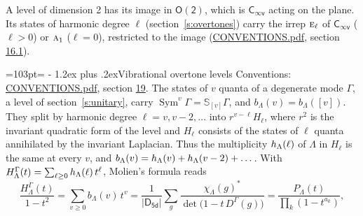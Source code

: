 \documentclass[10pt,a4paper]{article}
\makeatletter
\renewcommand\section{\@startsection{section}{1}{\z@}{-3ex plus -1ex minus -.2ex}%
  {1.2ex plus .2ex}{\normalfont\large\sffamily\bfseries\color{parttitle}}}
\newcommand{\needspace}[1]{\par\penalty-100\begingroup\dimen0=#1\relax\dimen2=\pagegoal
  \advance\dimen2-\pagetotal\ifdim\dimen0>\dimen2\relax\ifdim\dimen2>0pt\vfil\break\fi\fi
  \endgroup}
\numberwithin{equation}{section}
\newcommand{\grp}[1]{\mathsf{#1}}
\newcommand{\irr}[1]{\text{\normalfont\scshape #1}}
\newcommand{\repD}[1]{D^{#1}}
\newcommand{\irchar}[1]{\chi_{#1}}
\newcommand{\conj}[1]{{#1}^{*}}
\newcommand{\schur}[1]{\mathbb{S}_{#1}}
\newcommand{\shape}[1]{[#1]}
\makeatother
\begin{document}
A level of dimension 2 has its image in $\grp{O(2)}$, which is \href{Cinfv.pdf}{$\grp{C_{\infty v}}$} acting on the plane. \label{n:index.harmonic.degree}Its states of harmonic degree $\ell$ (section~\ref{s:overtones}) carry the irrep $\irr{e}_{\ell}$ of \href{Cinfv.pdf}{$\grp{C_{\infty v}}$} ($\ell > 0$) or $\irr{a}_{1}$ ($\ell = 0$), restricted to the image (\href{../../CONVENTIONS.pdf}{CONVENTIONS.pdf}, section \href{../../CONVENTIONS.pdf\#conv.16.1}{16.1}).
\needspace{103pt}
\section{Vibrational overtone levels}\label{s:overtones}
Conventions: \href{../../CONVENTIONS.pdf}{CONVENTIONS.pdf}, section \href{../../CONVENTIONS.pdf\#conv.19}{19}.
\leavevmode\label{n:index.quanta}\label{n:operator.symmetric.power}The states of $v$ quanta of a degenerate mode $\Gamma$, a level of section~\ref{s:unitary}, carry $\operatorname{Sym}^{v}\Gamma = \schur{\shape{v}}\Gamma$, and $b_\Lambda(v) = b_\Lambda(\shape{v})$. \label{n:local.quadratic.form}\label{n:set.harmonic}They split by harmonic degree $\ell = v, v - 2, \dots$ into $r^{v-\ell}H_\ell$, where $r^2$ is the invariant quadratic form of the level and $H_\ell$ consists of the states of $\ell$ quanta annihilated by the invariant Laplacian. \label{n:function.multiplicity.harmonic}Thus the multiplicity $\mathnormal{h}_\Lambda(\ell)$ of $\Lambda$ in $H_\ell$ is the same at every $v$, and $b_\Lambda(v) = \mathnormal{h}_\Lambda(v) + \mathnormal{h}_\Lambda(v - 2) + \dots$. \label{n:function.generating.level}With $H^{\Gamma}_\Lambda(t) = \sum_{\ell\ge0} \mathnormal{h}_\Lambda(\ell)\,t^{\ell}$, Molien's formula reads
\begin{equation}\label{e:molien}\frac{H^{\Gamma}_\Lambda(t)}{1 - t^2} = \sum_{v\ge0} b_\Lambda(v)\,t^v = \frac{1}{|\grp{D_{5d}}|}\sum_{g}\frac{\conj{\irchar{\Lambda}(g)}}{\det\bigl(1 - t\,\repD{\Gamma}(g)\bigr)} = \frac{P_\Lambda(t)}{\prod_k (1-t^{a_k})},\end{equation}
\end{document}
